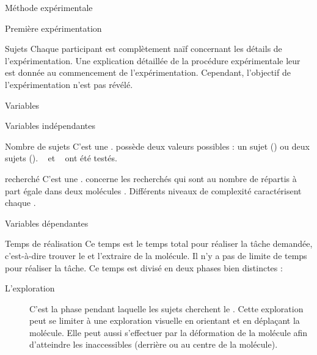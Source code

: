 \documentclass[myfrancais,ngerman,english,frenchb]{mythesis}
\begin{document}
\begin{mychapter}{Méthode expérimentale}
\begin{mysection}{Première expérimentation}
\begin{mysubsection}{Sujets}
				Chaque participant est complètement naïf concernant les détails de l'expérimentation.
				Une explication détaillée de la procédure expérimentale leur est donnée au commencement de l'expérimentation.
				Cependant, l'objectif de l'expérimentation n'est pas révélé.
			\end{mysubsection}
			\begin{mysubsection}{Variables}
				\begin{mysubsubsection}{Variables indépendantes}
					\begin{myparagraph}{ Nombre de sujets}
						C'est une .
						 possède deux valeurs possibles : \og un sujet \fg (\mycf {}) ou \og deux sujets \fg (\mycf {}).
						~ et ~ ont été testés.
					\end{myparagraph}
					\begin{myparagraph}{  recherché}
						C'est une .
						 concerne les  recherchés qui sont au nombre de  répartis à part égale dans deux molécules .
						Différents niveaux de complexité caractérisent chaque  .
					\end{myparagraph}
				\end{mysubsubsection}
				\begin{mysubsubsection}{Variables dépendantes}
					\begin{myparagraph}{ Temps de réalisation}
						Ce temps est le temps total pour réaliser la tâche demandée, c'est-à-dire trouver le  et l'extraire de la molécule.
						Il n'y a pas de limite de temps pour réaliser la tâche.
						Ce temps est divisé en deux phases bien distinctes :
						\begin{description}
							\item[L'exploration] C'est la phase pendant laquelle les sujets cherchent le .
								Cette exploration peut se limiter à une exploration visuelle en orientant et en déplaçant la molécule.
								Elle peut aussi s'effectuer par la déformation de la molécule afin d'atteindre les  inaccessibles (derrière ou au centre de la molécule).

\end{description}
\end{myparagraph}
\end{mysubsubsection}
\end{mysubsection}
\end{mysection}
\end{mychapter}
\end{document}
